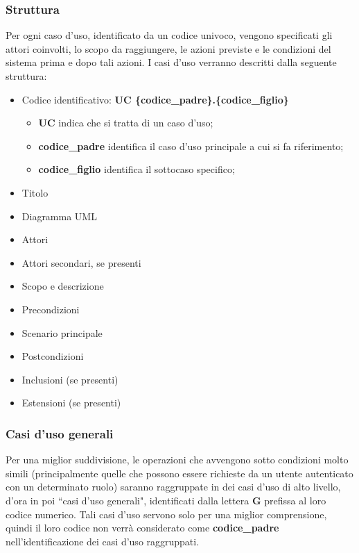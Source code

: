 \subsubsection{Struttura}
Per ogni caso d'uso, identificato da un codice univoco, vengono specificati gli attori coinvolti, lo scopo da raggiungere, le azioni previste e le condizioni del sistema prima e dopo tali azioni. I casi d'uso verranno descritti dalla seguente struttura:
\begin{itemize}
    \item Codice identificativo: \textbf{UC \{codice\_padre\}.\{codice\_figlio\}}
        \vspace{-5pt}
        \begin{itemize}
            \item \textbf{UC} indica che si tratta di un caso d'uso;
            \item \textbf{codice\_padre} identifica il caso d'uso principale a cui si fa riferimento;
            \item \textbf{codice\_figlio} identifica il sottocaso specifico;
        \end{itemize}
        \vspace{-5pt}
    \item Titolo
    \item Diagramma UML
    \item Attori
    \item Attori secondari, se presenti
    \item Scopo e descrizione
    \item Precondizioni
    \item Scenario principale
    \item Postcondizioni
    \item Inclusioni (se presenti)
    \item Estensioni (se presenti)
\end{itemize}
\vspace{-12pt}
\subsubsection{Casi d'uso generali}
Per una miglior suddivisione, le operazioni che avvengono sotto condizioni molto simili (principalmente quelle che possono essere richieste da un utente autenticato con un determinato ruolo) saranno raggruppate in dei casi d'uso di alto livello, d'ora in poi ``casi d'uso generali", identificati dalla lettera \textbf{G} prefissa al loro codice numerico. Tali casi d'uso servono solo per una miglior comprensione, quindi il loro codice non verrà considerato come \textbf{codice\_padre} nell'identificazione dei casi d'uso raggruppati.

